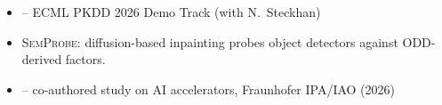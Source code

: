 {{    %
    \raggedright
    \vspace{0.55em}
    \begin{itemize}
        \item {} -- ECML PKDD 2026 Demo Track (with N.\ Steckhan)
        \ifcvshowsemprobe
        \item[] {\footnotesize \textsc{SemProbe}: diffusion-based inpainting probes object detectors against ODD-derived factors.}
        \fi
        \item {} -- co-authored study on AI accelerators, Fraunhofer IPA/IAO (2026)
    \end{itemize}
}}
